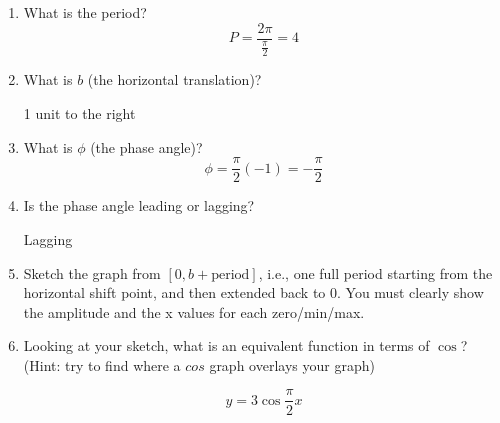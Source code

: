 \documentclass[letterpaper,12pt,fleqn]{article}
\begin{document}
\begin{enumerate}
\begin{enumerate}
\item What is the period?
  \[P=\frac{2\pi}{\frac{\pi}{2}}=4\]
  
\item What is $b$ (the horizontal translation)?

  \bigskip

  1 unit to the right

  \bigskip
  
\item What is $\phi$ (the phase angle)?
  \[\phi=\frac{\pi}{2}(-1)=-\frac{\pi}{2}\]
  
\item Is the phase angle leading or lagging?

  \bigskip

  Lagging

  \bigskip
  
\item Sketch the graph from $[0, b+\mbox{period}]$, i.e., one full period
starting from the horizontal shift point, and then extended back to 0. You must
clearly show the amplitude and the x values for each zero/min/max.


\item Looking at your sketch, what is an equivalent function in terms of
  $\cos$? (Hint: try to find where a $cos$ graph overlays your graph)

  \[y=3\cos\frac{\pi}{2}x\]
\end{enumerate}
\end{enumerate}
\end{document}
